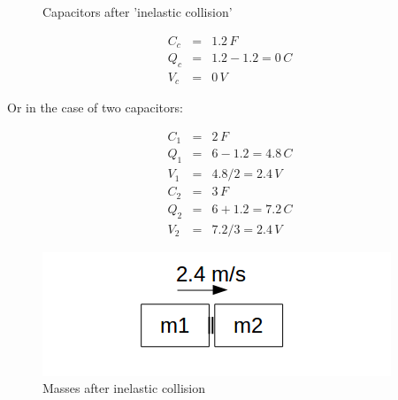 \begin{figure}[ht] \centering
	\qquad
	\caption{Capacitors after 'inelastic collision'}
\end{figure}

\begin{eqnarray}
C_c &=& 1.2 \, F \\
Q_c &=& 1.2 - 1.2 = 0 \, C \\
V_c &=& 0 \, V
\end{eqnarray}

Or in the case of two capacitors:

\begin{eqnarray}
C_1 &=& 2 \, F \\
Q_1 &=& 6 - 1.2 = 4.8 \, C \\
V_1 &=& 4.8 / 2 = 2.4 \, V \\
C_2 &=& 3 \, F \\
Q_2 &=& 6 + 1.2 = 7.2 \, C \\
V_2 &=& 7.2 / 3 = 2.4 \, V
\end{eqnarray}

\begin{figure}[ht] \centering
	\includegraphics[scale=.5]{mms2} \caption{Masses after inelastic collision}
\end{figure}


